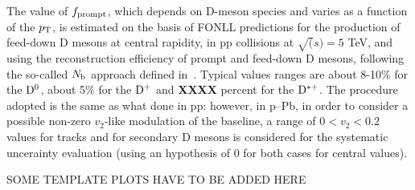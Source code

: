 The value of $f_{\rm prompt}$, which depends on D-meson species and varies as a function of the $p_{\rm T}$, is estimated on the basis of FONLL predictions for the production of feed-down D mesons at central rapidity, in pp collisions at $\sqrt(s) = 5$ TeV, and using the reconstruction efficiency of prompt and feed-down D mesons, following the so-called $N_{\rm b}$ approach defined in~\cite{ALICEDmespp7Tev}. Typical values ranges are about 8-10\% for the
${\rm D^0}$, about 5\% for the ${\rm D^+}$ and {\bf XXXX} percent for the ${\rm D^{*+}}$. The procedure adopted is the same as what done in pp: however, in p--Pb, in order to consider a possible non-zero $v_{2}$-like modulation of the baseline, a range of $0<v_{2}<0.2$ values for tracks and for secondary D mesons is considered for the systematic uncerainty evaluation (using an hypothesis of 0 for both cases for central values).

SOME TEMPLATE PLOTS HAVE TO BE ADDED HERE


\newpage %